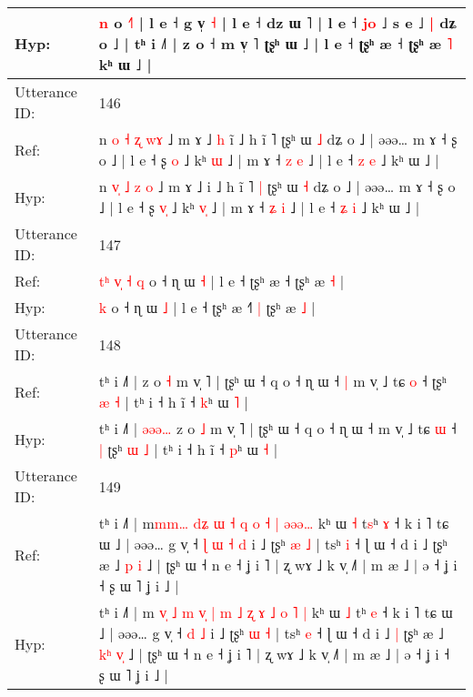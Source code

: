 \documentclass[10pt]{article}
\DeclareRobustCommand{\hl}[1]{{\textcolor{red}{#1}}}
\begin{document}
\begin{longtable}{ll}
Hyp: & \hl{n} o \hl{˧}˥ | l e ˧ g v̩ \hl{˧} | l e ˧ dz ɯ ˥ | l e ˧ \hl{}\hl{j}\hl{o} ˩ s e ˩\hl{ }\hl{|} dʑ o ˩ | tʰ i ˩˥ | z o ˧ m v̩ ˥ ʈʂʰ ɯ ˩ | l e ˧ ʈʂʰ æ ˧ ʈʂʰ æ \hl{˥} kʰ ɯ ˩ |
 \\
\midrule
Utterance ID: & 146 \\
Ref: & n \hl{}\hl{o} \hl{˧} \hl{ʐ} \hl{w}\hl{ɤ} ˩ m ɤ ˩\hl{ }\hl{h} i\hl{̃} ˩ h ĩ ˥\hl{}\hl{} ʈʂʰ ɯ \hl{˩} dʑ o ˩ | əəə… m ɤ ˧ ʂ o ˩ | l e ˧ ʂ \hl{}\hl{o} ˩ kʰ \hl{}\hl{ɯ} ˩ | m ɤ ˧ \hl{z} \hl{e} ˩ | l e ˧ \hl{z} \hl{e} ˩ kʰ ɯ ˩ |
 \\
Hyp: & n \hl{v}\hl{̩} \hl{˩} \hl{z} \hl{}\hl{o} ˩ m ɤ ˩\hl{}\hl{} i\hl{} ˩ h ĩ ˥\hl{ }\hl{|} ʈʂʰ ɯ \hl{˧} dʑ o ˩ | əəə… m ɤ ˧ ʂ o ˩ | l e ˧ ʂ \hl{v}\hl{̩} ˩ kʰ \hl{v}\hl{̩} ˩ | m ɤ ˧ \hl{ʑ} \hl{i} ˩ | l e ˧ \hl{ʑ} \hl{i} ˩ kʰ ɯ ˩ |
 \\
\midrule
Utterance ID: & 147 \\
Ref: & \hl{t}\hl{ʰ}\hl{ }\hl{v}\hl{̩}\hl{ }\hl{˧}\hl{ }\hl{q} o ˧ ɳ ɯ \hl{˧} | l e ˧ ʈʂʰ æ ˧\hl{}\hl{}\hl{} ʈʂʰ æ \hl{˧} |
 \\
Hyp: & \hl{}\hl{}\hl{}\hl{}\hl{}\hl{}\hl{}\hl{}\hl{k} o ˧ ɳ ɯ \hl{˩} | l e ˧ ʈʂʰ æ ˧\hl{˥}\hl{ }\hl{|} ʈʂʰ æ \hl{˩} |
 \\
\midrule
Utterance ID: & 148 \\
Ref: & tʰ i ˩˥ |\hl{}\hl{}\hl{}\hl{}\hl{} z o \hl{˧} m v̩ ˥ | ʈʂʰ ɯ ˧ q o ˧ ɳ ɯ ˧\hl{ }\hl{|} m v̩ ˩ tɕ \hl{o} ˧\hl{}\hl{} ʈʂʰ \hl{æ} \hl{˧} | tʰ i ˧ h ĩ ˧ \hl{k}ʰ ɯ \hl{˥} |
 \\
Hyp: & tʰ i ˩˥ |\hl{ }\hl{ə}\hl{ə}\hl{ə}\hl{…} z o \hl{˩} m v̩ ˥ | ʈʂʰ ɯ ˧ q o ˧ ɳ ɯ ˧\hl{}\hl{} m v̩ ˩ tɕ \hl{ɯ} ˧\hl{ }\hl{|} ʈʂʰ \hl{ɯ} \hl{˩} | tʰ i ˧ h ĩ ˧ \hl{p}ʰ ɯ \hl{˧} |
 \\
\midrule
Utterance ID: & 149 \\
Ref: & tʰ i ˩˥ | m\hl{}\hl{}\hl{}\hl{}\hl{m}\hl{m}\hl{…} \hl{d}\hl{ʑ} \hl{ɯ} \hl{˧} \hl{q} \hl{o} \hl{˧} \hl{|} \hl{}\hl{ə}\hl{ə}\hl{ə}\hl{…} kʰ ɯ \hl{˧} t\hl{s}ʰ \hl{ɤ} ˧ k i ˥ tɕ ɯ ˩ | əəə… g v̩ ˧\hl{ }\hl{ɭ}\hl{ }\hl{ɯ} \hl{˧} \hl{d} i ˩ ʈʂʰ \hl{æ} \hl{˩} | tsʰ \hl{i} ˧ ɭ ɯ ˧ d i ˩\hl{}\hl{} ʈʂʰ æ ˩ \hl{}\hl{p} \hl{}\hl{i} ˩ | ʈʂʰ ɯ ˧ n e ˧ ʝ i ˥ | ʐ wɤ ˩ k v̩ ˩˥ | m æ ˩ | ə ˧ ʝ i ˧ ʂ ɯ ˥ ʝ i ˩ |
 \\
Hyp: & tʰ i ˩˥ | m\hl{ }\hl{v}\hl{̩}\hl{ }\hl{˩}\hl{ }\hl{m} \hl{v}\hl{̩} \hl{|} \hl{m} \hl{˩} \hl{ʐ} \hl{ɤ} \hl{˩} \hl{o}\hl{ }\hl{˥}\hl{ }\hl{|} kʰ ɯ \hl{˩} t\hl{}ʰ \hl{e} ˧ k i ˥ tɕ ɯ ˩ | əəə… g v̩ ˧\hl{}\hl{}\hl{}\hl{} \hl{d} \hl{˩} i ˩ ʈʂʰ \hl{ɯ} \hl{˧} | tsʰ \hl{e} ˧ ɭ ɯ ˧ d i ˩\hl{ }\hl{|} ʈʂʰ æ ˩ \hl{k}\hl{ʰ} \hl{v}\hl{̩} ˩ | ʈʂʰ ɯ ˧ n e ˧ ʝ i ˥ | ʐ wɤ ˩ k v̩ ˩˥ | m æ ˩ | ə ˧ ʝ i ˧ ʂ ɯ ˥ ʝ i ˩ |

\end{longtable}
\end{document}
